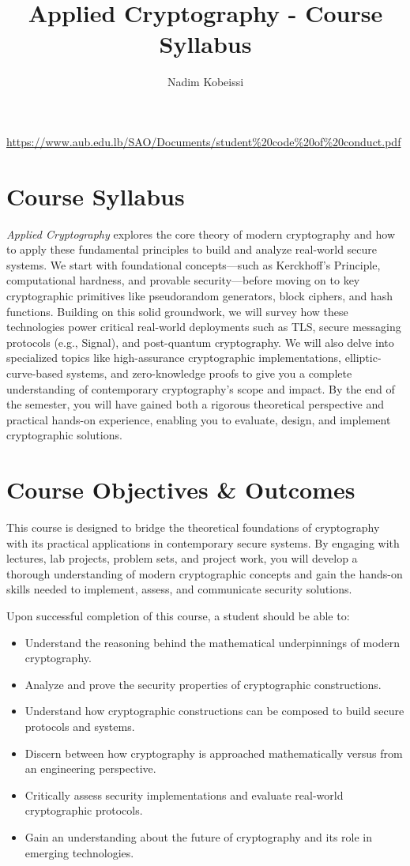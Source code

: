 \documentclass[10pt,a4paper,american]{article}
\title{Applied Cryptography - Course Syllabus}
\author{Nadim Kobeissi}
\begin{document}
\classhandoutheader
\urldef{\urlcodeofconduct}\url{https://www.aub.edu.lb/SAO/Documents/student%20code%20of%20conduct.pdf}
\section*{Course Syllabus}

\textit{Applied Cryptography} explores the core theory of modern cryptography and how to apply these fundamental principles to build and analyze real-world secure systems. We start with foundational concepts—such as Kerckhoff's Principle, computational hardness, and provable security—before moving on to key cryptographic primitives like pseudorandom generators, block ciphers, and hash functions. Building on this solid groundwork, we will survey how these technologies power critical real-world deployments such as TLS, secure messaging protocols (e.g., Signal), and post-quantum cryptography. We will also delve into specialized topics like high-assurance cryptographic implementations, elliptic-curve-based systems, and zero-knowledge proofs to give you a complete understanding of contemporary cryptography's scope and impact. By the end of the semester, you will have gained both a rigorous theoretical perspective and practical hands-on experience, enabling you to evaluate, design, and implement cryptographic solutions.

\section{Course Objectives \& Outcomes}
This course is designed to bridge the theoretical foundations of cryptography with its practical applications in contemporary secure systems. By engaging with lectures, lab projects, problem sets, and project work, you will develop a thorough understanding of modern cryptographic concepts and gain the hands-on skills needed to implement, assess, and communicate security solutions.

Upon successful completion of this course, a student should be able to:

\begin{itemize}
	\item Understand the reasoning behind the mathematical underpinnings of modern cryptography.
	\item Analyze and prove the security properties of cryptographic constructions.
	\item Understand how cryptographic constructions can be composed to build secure protocols and systems.
	\item Discern between how cryptography is approached mathematically versus from an engineering perspective.
	\item Critically assess security implementations and evaluate real-world cryptographic protocols.
	\item Gain an understanding about the future of cryptography and its role in emerging technologies.
\end{itemize}
\end{document}
